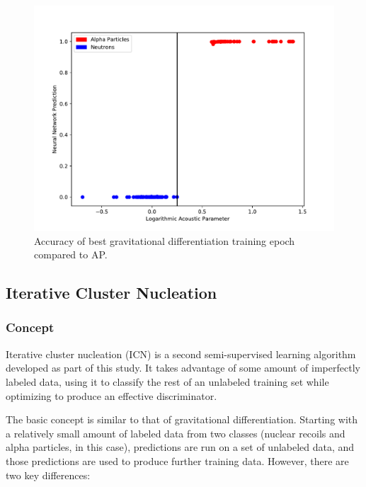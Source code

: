 \documentclass[10pt]{article}
\begin{document}
\begin{figure}[H]
    \centering
    \includegraphics[width=\textwidth]{grav_grid_search}
    \caption{\label{grav_grid_search} Accuracy of best gravitational differentiation training epoch compared to AP.}
\end{figure}

\subsection{Iterative Cluster Nucleation}

\subsubsection{Concept}

Iterative cluster nucleation (ICN) is a second semi-supervised learning algorithm developed as part of this study. It takes advantage of some amount of imperfectly labeled data, using it to classify the rest of an unlabeled training set while optimizing to produce an effective discriminator.

The basic concept is similar to that of gravitational differentiation. Starting with a relatively small amount of labeled data from two classes (nuclear recoils and alpha particles, in this case), predictions are run on a set of unlabeled data, and those predictions are used to produce further training data. However, there are two key differences:
\end{document}
